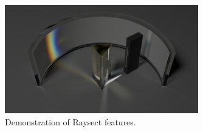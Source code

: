 \documentclass[../main.tex]{subfiles}
\begin{document}
\begin{figure}
    \centering
    \includegraphics[width=0.75\textwidth]{images/raysect_demo}
    \caption{Demonstration of Raysect features.}%
    \label{fig:raysect_demo}
\end{figure}
\end{document}
